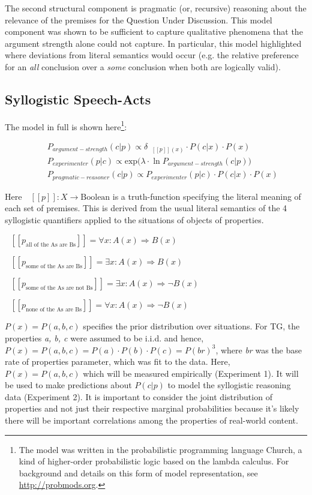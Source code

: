 \documentclass{llncs} %
\newcommand{\denote}[1]{\mbox{ $[\![ #1 ]\!]$}}
\begin{document}
The second structural component is pragmatic (or, recursive) reasoning about the relevance of the premises for the Question Under Discussion. This model component was shown to be sufficient to capture qualitative phenomena that the argument strength alone could not capture. In particular, this model highlighted where deviations from literal semantics would occur (e.g. the relative preference for an \emph{all} conclusion over a \emph{some} conclusion when both are logically valid). 


\subsection{Syllogistic Speech-Acts}

The model in full is shown here\footnote{The model was written in the probabilistic programming language Church\cite{probmods}, a kind of higher-order probabilistic logic based on the lambda calculus. For background and details on this form of model representation, see \url{http://probmods.org}.}:

\begin{eqnarray}
&&P_{argument-strength}(c|p)\propto \delta_{\denote{p}(x)} \cdot P(c|x)  \cdot P(x) \\ %
&&P_{experimenter}(p|c) \propto \mathrm{exp}({\lambda \cdot \ln P_{argument-strength}(c|p))}\\ 
&&P_{pragmatic-reasoner}(c|p)\propto P_{experimenter}(p|c)\cdot P(c|x)  \cdot P(x)
\end{eqnarray}

Here $\denote{p}: X \rightarrow \text{Boolean}$ is a truth-function specifying the literal meaning of each set of premises. This is derived from the 
usual literal semantics of the 4 syllogistic quantifiers applied to the situations of objects of properties. 

$\denote{p_{\textrm{all of the As are Bs}}}=\forall{x}: A(x) \Rightarrow B(x)$

$\denote{p_{\textrm{some of the As are Bs}}}= \exists{x}: A(x) \Rightarrow B(x)$

$\denote{p_{\textrm{some of the As are not Bs}}}= \exists{x}: A(x) \Rightarrow \neg{B(x)}$

$\denote{p_{\textrm{none of the As are Bs}}}= \forall{x}: A(x) \Rightarrow \neg{B(x)}$

$P(x) = P(a,b,c)$ specifies the prior distribution over situations. For TG, the properties \emph{a, b, c} were assumed to be i.i.d. and hence, $P(x) = P(a, b, c) = P(a)\cdot P(b)\cdot P(c) = P(br)^3$, where \emph{br} was the base rate of properties parameter, which was fit to the data. Here, $P(x) = P(a, b, c)$ which will be measured empirically (Experiment 1). It will be used to make predictions about $P(c|p)$ to model the syllogistic reasoning data (Experiment 2). It is important to consider the joint distribution of properties and not just their respective marginal probabilities because it's likely there will be important correlations among the properties of real-world content.
\end{document}
